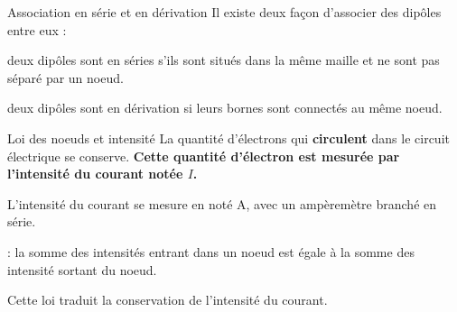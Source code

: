 

\begin{doc}{Association en série et en dérivation}
  Il existe deux façon d'associer des dipôles entre eux :
  \begin{listePoints}
    \item deux dipôles sont en séries s'ils sont situés dans la même maille et ne sont pas séparé par un noeud.
    \item deux dipôles sont en dérivation si leurs bornes sont connectés au même noeud.
  \end{listePoints}
\end{doc}

\newpage
\vspace*{-28pt}


\vspace*{-10pt}
\begin{doc}{Loi des noeuds et intensité}
  \chevron La quantité d'électrons qui \textbf{circulent} dans le circuit électrique se conserve.
  \textbf{Cette quantité d'électron est mesurée par l'intensité du courant notée $I$.}
  \begin{encart}
    L'intensité du courant se mesure en  noté A, avec un ampèremètre branché en série.
  \end{encart}
  \begin{encart}
     : la somme des intensités entrant dans un noeud est égale à la somme des intensité sortant du noeud.
  \end{encart}
  Cette loi traduit la conservation de l'intensité du courant.
\end{doc}




